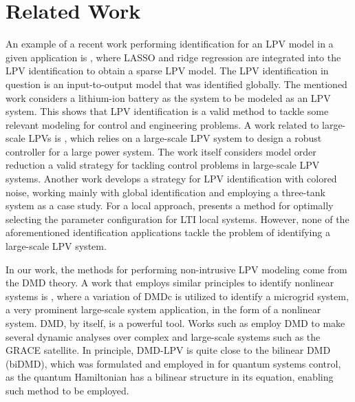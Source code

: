 \section{Related Work}
\label{sec:rel_work} 

An example of a recent work performing identification for an LPV model in a given application is \cite{Sheikh2024}, where LASSO and ridge regression are integrated into the LPV identification to obtain a sparse LPV model.
%
The LPV identification in question is an input-to-output model that was identified globally. The mentioned work considers a lithium-ion battery as the system to be modeled as an LPV system.
%
This shows that LPV identification is a valid method to tackle some relevant modeling for control and engineering problems.
%
A work related to large-scale LPVs is \cite{Dehghani2024}, which relies on a large-scale LPV system to design a robust controller for a large power system.
%
The work itself considers model order reduction a valid strategy for tackling control problems in large-scale LPV systems.
%
Another work \cite{Liu2024} develops a strategy for LPV identification with colored noise, working mainly with global identification and employing a three-tank system as a case study.
%
For a local approach, \cite{Bombois2021} presents a method for optimally selecting the parameter configuration for LTI local systems.
%
However, none of the aforementioned identification applications tackle the problem of identifying a large-scale LPV system.


%
In our work, the methods for performing non-intrusive LPV modeling come from the DMD theory.
%
A work that employs similar principles to identify nonlinear systems is \cite{Jiang2024}, where a variation of DMDc is utilized to identify a microgrid system, a very prominent large-scale system application, in the form of a nonlinear system.
%
DMD, by itself, is a powerful tool.
%
Works such as \cite{Libero2024} employ DMD to make several dynamic analyses over complex and large-scale systems such as the GRACE satellite.
%
In principle, DMD-LPV is quite close to the bilinear DMD (biDMD), which was formulated and employed in \cite{Goldschmidt2021} for quantum systems control, as the quantum Hamiltonian has a bilinear structure in its equation, enabling such method to be employed.


